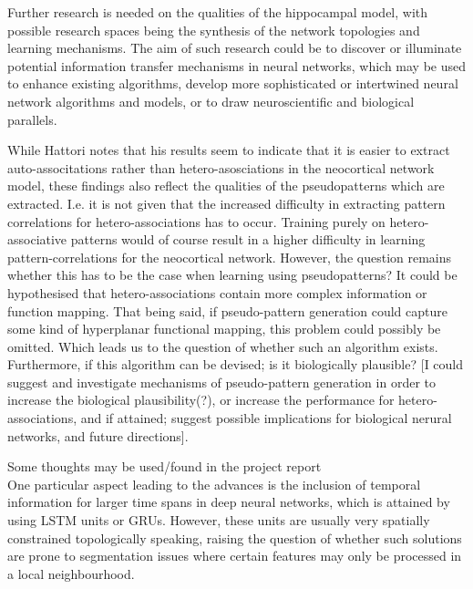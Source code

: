 Further research is needed on the qualities of the hippocampal model, with possible research spaces being the synthesis of the network topologies and learning mechanisms. The aim of such research could be to discover or illuminate potential information transfer mechanisms in neural networks, which may be used to enhance existing algorithms, develop more sophisticated or intertwined neural network algorithms and models, or to draw neuroscientific and biological parallels.


While Hattori notes that his results seem to indicate that it is easier to extract auto-associtations rather than hetero-asosciations in the neocortical network model, these findings also reflect the qualities of the pseudopatterns which are extracted. I.e. it is not given that the increased difficulty in extracting pattern correlations for hetero-associations has to occur. Training purely on hetero-associative patterns would of course result in a higher difficulty in learning pattern-correlations for the neocortical network. However, the question remains whether this has to be the case when learning using pseudopatterns? It could be hypothesised that hetero-associations contain more complex information or function mapping. That being said, if pseudo-pattern generation could capture some kind of hyperplanar functional mapping, this problem could possibly be omitted. Which leads us to the question of whether such an algorithm exists. Furthermore, if this algorithm can be devised; is it biologically plausible? [I could suggest and investigate mechanisms of pseudo-pattern generation in order to increase the biological plausibility(?), or increase the performance for hetero-associations, and if attained; suggest possible implications for biological nerural networks, and future directions].

Some thoughts may be used/found in the project report
\\

One particular aspect leading to the advances is the inclusion of temporal information for larger time spans in deep neural networks, which is attained by using LSTM units or GRUs. However, these units are usually very spatially constrained topologically speaking, raising the question of whether such solutions are prone to segmentation issues where certain features may only be processed in a local neighbourhood.
\\\\

